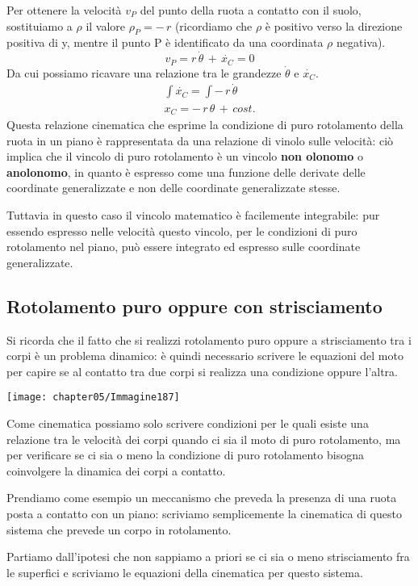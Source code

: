 Per ottenere la velocità $v_P$ del punto della ruota a contatto con il suolo, sostituiamo a $\rho$ il valore $\rho_P = -\,r$ (ricordiamo che $\rho$ è positivo verso la direzione positiva di y, mentre il punto P è identificato da una coordinata $\rho$ negativa).
\[v_P = r\,\dot{\theta}\,+\,\dot{x_C} = 0\]
Da cui possiamo ricavare una relazione tra le grandezze $\dot{\theta}$ e $\dot{x_C}$.
\begin{gather*}
\int \dot{x_C} = \int -\,r\,\dot{\theta}\\
x_C = -\,r\,\theta\,+\,cost.
\end{gather*} 
Questa relazione cinematica che esprime la condizione di puro rotolamento della ruota in un piano è rappresentata da una relazione di vinolo sulle velocità: ciò implica che il vincolo di puro rotolamento è un vincolo \textbf{non olonomo} o \textbf{anolonomo}, in quanto è espresso come una funzione delle derivate delle coordinate generalizzate e non delle coordinate generalizzate stesse.

Tuttavia in questo caso il vincolo matematico è facilemente integrabile: pur essendo espresso nelle velocità questo vincolo, per le condizioni di puro rotolamento nel piano, può essere integrato ed espresso sulle coordinate generalizzate.

\subsection{Rotolamento puro oppure con strisciamento}

Si ricorda che il fatto che si realizzi rotolamento puro oppure a strisciamento tra i corpi è un problema dinamico: è quindi necessario scrivere le equazioni del moto per capire se al contatto tra due corpi si realizza una condizione oppure l'altra.
\begin{center}
\texttt{[image: chapter05/Immagine187]}
\end{center}

Come cinematica possiamo solo scrivere condizioni per le quali esiste una relazione tra le velocità dei corpi quando ci sia il moto di puro rotolamento, ma per verificare se ci sia o meno la condizione di puro rotolamento bisogna coinvolgere la dinamica dei corpi a contatto.

Prendiamo come esempio un meccanismo che preveda la presenza di una ruota posta a contatto con un piano: scriviamo semplicemente la cinematica di questo sistema che prevede un corpo in rotolamento.

Partiamo dall'ipotesi che non sappiamo a priori se ci sia o meno strisciamento fra le superfici e scriviamo le equazioni della cinematica per questo sistema.

